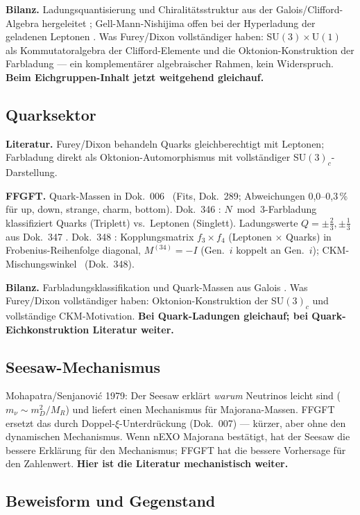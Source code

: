 \textbf{Bilanz.} Ladungsquantisierung und Chiralitätsstruktur aus der
Galois/Clifford-Algebra hergeleitet \BM; Gell-Mann-Nishijima offen bei der
Hyperladung der geladenen Leptonen \SM.
Was Furey/Dixon vollständiger haben: SU$(3)\times$U$(1)$ als Kommutatoralgebra
der Clifford-Elemente und die Oktonion-Konstruktion der Farbladung ---
ein komplementärer algebraischer Rahmen, kein Widerspruch.
\textbf{Beim Eichgruppen-Inhalt jetzt weitgehend gleichauf.}

\subsection{Quarksektor}

\textbf{Literatur.}
Furey/Dixon behandeln Quarks gleichberechtigt mit Leptonen;
Farbladung direkt als Oktonion-Automorphismus mit vollständiger SU$(3)_c$-Darstellung.

\textbf{FFGFT.}
Quark-Massen in Dok.~006 \SM\ (Fits, Dok.~289; Abweichungen 0,0--0,3\,\% für up, down,
strange, charm, bottom). Dok.~346 \BM: $N\bmod3$-Farbladung klassifiziert
Quarks (Triplett) vs.\ Leptonen (Singlett). Ladungswerte $Q=\pm\tfrac{2}{3},
\pm\tfrac{1}{3}$ aus Dok.~347 \BM. Dok.~348 \BM: Kopplungsmatrix $f_3\times f_4$
(Leptonen $\times$ Quarks) in Frobenius-Reihenfolge diagonal, $M^{(34)}=-I$
(Gen.~$i$ koppelt an Gen.~$i$); CKM-Mischungswinkel \SM\ (Dok.~348).

\textbf{Bilanz.} Farbladungsklassifikation und Quark-Massen aus Galois \BM\KM.
Was Furey/Dixon vollständiger haben: Oktonion-Konstruktion der SU$(3)_c$
und vollständige CKM-Motivation.
\textbf{Bei Quark-Ladungen gleichauf; bei Quark-Eichkonstruktion Literatur weiter.}

\subsection{Seesaw-Mechanismus}

Mohapatra/Senjanović 1979: Der Seesaw erklärt \emph{warum} Neutrinos
leicht sind ($m_\nu\sim m_D^2/M_R$) und liefert einen Mechanismus für
Majorana-Massen. FFGFT ersetzt das durch Doppel-$\xi$-Unterdrückung
(Dok.~007) --- kürzer, aber ohne den dynamischen Mechanismus.
Wenn nEXO Majorana bestätigt, hat der Seesaw die bessere Erklärung
für den Mechanismus; FFGFT hat die bessere Vorhersage für den Zahlenwert.
\textbf{Hier ist die Literatur mechanistisch weiter.}

\subsection{Beweisform und Gegenstand}

